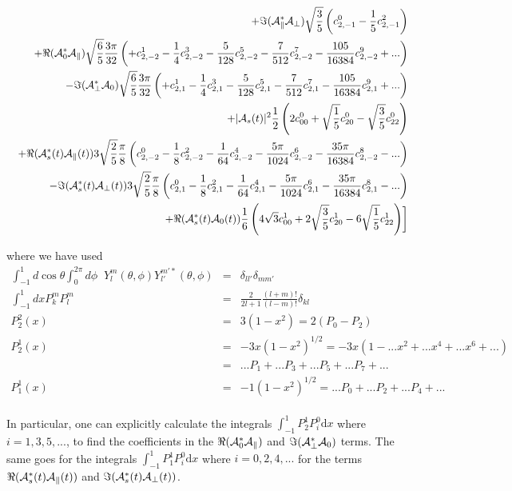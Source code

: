 \documentclass[a4paper,10pt,twosided]{article}
\begin{document}
\begin{eqnarray}
         &&                   +\Im({\cal A}_\parallel^*{\cal A}_\perp)\sqrt{\frac{3}{5}}\left(c^0_{2,-1}-\frac{1}{5}c^2_{2,-1}\right)  \\
         &&                   +\Re({\cal A}_0^*{\cal A}_\parallel)\sqrt{\frac{6}{5}}\frac{3\pi}{32}\left( +c^1_{2,-2}-\frac{1}{4}c^3_{2,-2}-\frac{5}{128}c^5_{2,-2}-\frac{7}{512}c^7_{2,-2} - \frac{105}{16384}c^9_{2,-2}+... \right) \\
         &&                   -\Im({\cal A}_\perp^* {\cal A}_0 )  \sqrt{\frac{6}{5}}\frac{3\pi}{32}\left( +c^1_{2,1} -\frac{1}{4}c^3_{2,1}- \frac{5}{128}c^5_{2,1} -\frac{7}{512}c^7_{2,1} - \frac{105}{16384}c^9_{2,1}+... \right) \\
          &&                  +|{\cal A}_{s}(t)|^2  \frac{1}{2} \left(2c^0_{00} + \sqrt{\frac{1}{5}}c^0_{20} -\sqrt{\frac{3}{5}} c^0_{22}\right) \\
          &&                  +\Re({\cal A}_{s}^*(t){\cal A}_\parallel(t)) 3 \sqrt{\frac{2}{5}}\frac{\pi}{8} \left(c^0_{2,-2}-\frac{1}{8}c^2_{2,-2}-\frac{1}{64}c^4_{2,-2}-\frac{5\pi}{1024}c^6_{2,-2}-\frac{35\pi}{16384}c^8_{2,-2}-...\right)\\
          &&                  -\Im({\cal A}_{s}^*(t){\cal A}_\perp(t)) 3\sqrt{\frac{2}{5}} \frac{\pi}{8} \left(c^0_{2,1}-\frac{1}{8}c^2_{2,1}-\frac{1}{64}c^4_{2,1}-\frac{5\pi}{1024}c^6_{2,1}-\frac{35\pi}{16384}c^8_{2,1}-...\right)\\
          &&                  +\Re({\cal A}_{s}^*(t){\cal A}_0(t)) \frac{1}{6}\left(4\sqrt{3}  c^1_{00} + 2 \sqrt{\frac{3}{5}} c^1_{20} - 6 \sqrt{\frac{1}{5}}c^1_{22}\right)
      \biggr]
\end{eqnarray}

where we have used 
\begin{eqnarray}
\int_{-1}^1 d\cos\theta \int_0^{2\pi} d\phi \;\;Y_l^m(\theta,\phi) Y_{l'}^{m'*}(\theta,\phi) &=& \delta_{ll'}\delta_{mm'}\\
\int_{-1}^1 dx  P_k^m P_l^m&=& \frac{2}{2l+1}\frac{(l+m)!}{(l-m)!}\delta_{kl} \\
P_2^2(x) &=& 3(1-x^2) = 2(P_0-P_2)\\
P_2^1(x) &=& -3x(1-x^2)^{1/2} = -3x(1-...  x^2 + ... x^4  + ...x^6 + ...) \\
&=& ...P_1 + ...P_3 + ...P_5 +...P_7 + ...\\
P_1^1(x) &=& -1(1-x^2)^{1/2} = ...P_0 + ...P_2 + ...P_4 + ...\\
\end{eqnarray}

In particular, one can explicitly calculate the integrals $\int_{-1}^{1}P_2^1P_i^0\mathrm{d}x$ where  $i = 1,3,5,...$, to find the coefficients in the $\Re({\cal A}_0^*{\cal A}_\parallel)$ and $\Im({\cal A}_\perp^* {\cal A}_0 )$ terms. The same goes for the integrals $\int_{-1}^{1}P_1^1P_i^0\mathrm{d}x$ where $i=0,2,4,...$ for the terms $\Re({\cal A}_{s}^*(t){\cal A}_\parallel(t))$ and $\Im({\cal A}_{s}^*(t){\cal A}_\perp(t))$.
\end{document}

